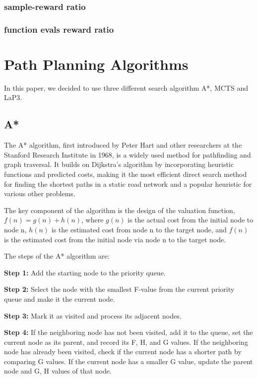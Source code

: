 \documentclass[bibliography=totoc]{scrartcl}
\begin{document}
\subsubsection{sample-reward ratio}
\subsubsection{function evals reward ratio}

\newpage
\section{Path Planning Algorithms}
\label{path_planning_algorithm}
In this paper, we decided to use three different search algorithm A*, \ac{MCTS} and \ac{LaP3}.

\subsection{A*}
The A* algorithm, first introduced by Peter Hart and other researchers at the Stanford Research Institute in 1968, is a widely used method for pathfinding and graph traversal. \cite{4082128} It builds on Dijkstra's algorithm by incorporating heuristic functions and predicted costs, making it the most efficient direct search method for finding the shortest paths in a static road network and a popular heuristic for various other problems.\cite{ProbabilisticApproachCollaborativeMultiRobotLocalization}

The key component of the algorithm is the design of the valuation function, $f(n) = g(n) + h(n)$, where $g(n)$ is the actual cost from the initial node to node n, $h(n)$ is the estimated cost from node n to the target node, and $f(n)$ is the estimated cost from the initial node via node n to the target node.

The steps of the A* algorithm are:

\textbf{Step 1:} Add the starting node to the priority queue.

\textbf{Step 2:} Select the node with the smallest F-value from the current priority queue and make it the current node.

\textbf{Step 3:} Mark it as visited and process its adjacent nodes.

\textbf{Step 4:} If the neighboring node has not been visited, add it to the queue, set the current node as its parent, and record its F, H, and G values. If the neighboring node has already been visited, check if the current node has a shorter path by comparing G values. If the current node has a smaller G value, update the parent node and G, H values of that node.
\end{document}
